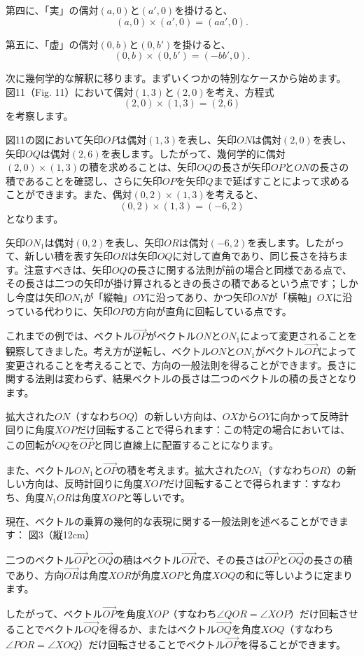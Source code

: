 \documentclass[a4paper,11pt,openany]{ltjsbook}
\begin{document}
第四に、「実」の偶対$(a, 0)$と$(a', 0)$を掛けると、
\[
(a, 0) × (a', 0) = (aa', 0).
\]

第五に、「虚」の偶対$(0, b)$と$(0, b')$を掛けると、
\[
(0, b) × (0, b') = (-bb', 0).
\]

次に幾何学的な解釈に移ります。まずいくつかの特別なケースから始めます。
図11（Fig. 11）において偶対$(1, 3)$と$(2, 0)$を考え、方程式
\[
(2, 0) × (1, 3) = (2, 6)
\]
を考察します。

図11の図において矢印$OP$は偶対$(1, 3)$を表し、矢印$ON$は偶対$(2, 0)$を表し、矢印$OQ$は偶対$(2, 6)$を表します。したがって、幾何学的に偶対$(2, 0) × (1, 3)$の積を求めることは、矢印$OQ$の長さが矢印$OP$と$ON$の長さの積であることを確認し、さらに矢印$OP$を矢印$Q$まで延ばすことによって求めることができます。また、偶対$(0, 2) × (1, 3)$を考えると、
\[
(0, 2) × (1, 3) = (-6, 2)
\]
となります。

矢印$ON_{1}$は偶対$(0, 2)$を表し、矢印$OR$は偶対$(-6, 2)$を表します。したがって、新しい積を表す矢印$OR$は矢印$OQ$に対して直角であり、同じ長さを持ちます。注意すべきは、矢印$OQ$の長さに関する法則が前の場合と同様である点で、その長さは二つの矢印が掛け算されるときの長さの積であるという点です；しかし今度は矢印$ON_{1}$が「縦軸」$OY$に沿ってあり、かつ矢印$ON$が「横軸」$OX$に沿っている代わりに、矢印$OP$の方向が直角に回転している点です。

これまでの例では、ベクトル$\vec{OP}$がベクトル$ON$と$ON_{1}$によって変更されることを観察してきました。考え方が逆転し、ベクトル$ON$と$ON_{1}$がベクトル$\vec{OP}$によって変更されることを考えることで、方向の一般法則を得ることができます。長さに関する法則は変わらず、結果ベクトルの長さは二つのベクトルの積の長さとなります。

拡大された$ON$（すなわち$OQ$）の新しい方向は、$OX$から$OY$に向かって反時計回りに角度$XOP$だけ回転することで得られます：この特定の場合においては、この回転が$OQ$を$\vec{OP}$と同じ直線上に配置することになります。

また、ベクトル$ON_{1}$と$\vec{OP}$の積を考えます。拡大された$ON_{1}$（すなわち$OR$）の新しい方向は、反時計回りに角度$XOP$だけ回転することで得られます：すなわち、角度$N_{1}OR$は角度$XOP$と等しいです。

現在、ベクトルの乗算の幾何的な表現に関する一般法則を述べることができます：
図3（縦12cm）

二つのベクトル$\vec{OP}$と$\vec{OQ}$の積はベクトル$\vec{OR}$で、その長さは$\vec{OP}$と$\vec{OQ}$の長さの積であり、方向$\vec{OR}$は角度$XOR$が角度$XOP$と角度$XOQ$の和に等しいように定まります。

したがって、ベクトル$\vec{OP}$を角度$XOP$（すなわち$\angle QOR = \angle XOP$）だけ回転させることでベクトル$\vec{OQ}$を得るか、またはベクトル$\vec{OQ}$を角度$XOQ$（すなわち$\angle POR = \angle XOQ$）だけ回転させることでベクトル$\vec{OP}$を得ることができます。
\end{document}
